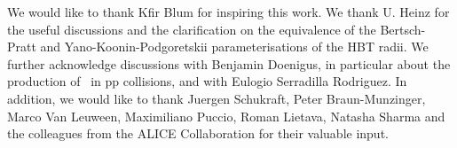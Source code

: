 \documentclass[%
 reprint,
 amsmath,amssymb,
 aps,
]{revtex4-1}
\begin{document}
\begin{acknowledgments}
We would like to thank Kfir Blum for inspiring this work. We thank U. Heinz for the useful discussions and the clarification on the equivalence of the Bertsch-Pratt and Yano-Koonin-Podgoretskii parameterisations of the HBT radii. We further acknowledge discussions with Benjamin Doenigus, in particular about the production of \hthreelambda\ in pp collisions, and with Eulogio Serradilla Rodriguez. In addition, we would like to thank Juergen Schukraft, Peter Braun-Munzinger, Marco Van Leuween, Maximiliano Puccio, Roman Lietava, Natasha Sharma and the colleagues from the ALICE Collaboration for their valuable input. 
\end{acknowledgments}


\end{document}
